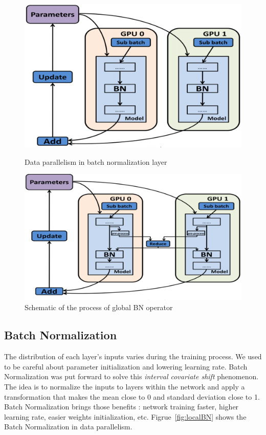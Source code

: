 \documentclass{llncs}
\begin{document}
\begin{figure}[h]
\begin{minipage}[t]{0.45\linewidth}
\centering
\includegraphics[width=1\textwidth]{figure/noreduce.png}
    \caption{Data parallelism in batch normalization layer}%
    \label{fig:localBN}
\end{minipage}
\hfill
\begin{minipage}[t]{0.45\linewidth}
\centering
\includegraphics[width=1\textwidth]{figure/reduce.png}
    \caption{Schematic of the process of global BN operator }
    \label{fig:globalBN}
\end{minipage}
\end{figure}

\subsection{Batch Normalization}

The distribution of each layer's inputs varies during the training process. We used to be careful about parameter initialization and lowering learning rate. Batch Normalization\cite{ioffe2015batch} was put forward to solve this \textit{interval covariate shift} phenomenon. The idea is to normalize the inputs to layers within the network and apply a transformation that makes the mean close to 0 and standard deviation close to 1. Batch Normalization brings those benefits : network training faster, higher learning rate, easier weights initialization, etc. Figrue~\ref{fig:localBN} shows the Batch Normalization in data parallelism.
\end{document}
